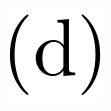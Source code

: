 \documentclass[
  letterpaper,
  DIV=11,
  numbers=noendperiod]{scrartcl}
\begin{document}
\begin{figure}
\begin{minipage}[t]{0.03\linewidth}
{{\includegraphics{figures/(d).png}

}

}

\end{minipage}%
%
\begin{minipage}[t]{0.01\linewidth}

{\centering 

~

}

\end{minipage}%
%
\begin{minipage}[t]{0.45\linewidth}

{\centering 


}

\end{minipage}%
%
\begin{minipage}[t]{0.01\linewidth}

{\centering 

}
\end{minipage}
\end{figure}
\end{document}
